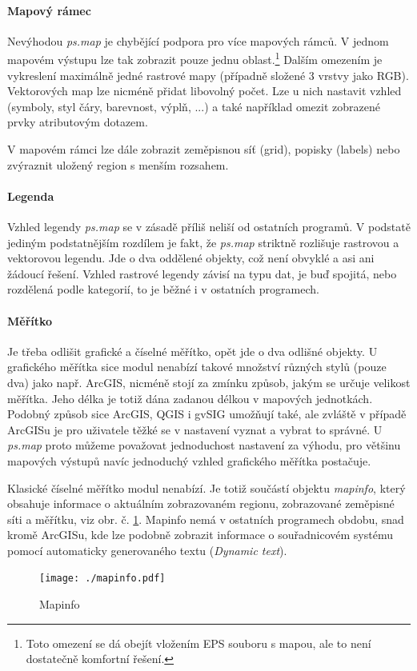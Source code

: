 \documentclass[a4paper,12pt,draft]{article}
\newcommand{\modul}[1]{\emph{#1}}
\begin{document}
\paragraph*{Mapový rámec}
Nevýhodou \modul{ps.map} je chybějící podpora pro více mapových
rámců. V jednom mapovém výstupu lze tak zobrazit pouze jednu
oblast.\footnote{Toto omezení se dá obejít vložením EPS souboru s mapou,
ale to není dostatečně komfortní řešení.} Dalším omezením je
vykreslení maximálně jedné rastrové mapy (případně složené 3 vrstvy
jako RGB). Vektorových map lze nicméně přidat libovolný počet. Lze u
nich nastavit vzhled (symboly, styl čáry, barevnost, výplň, ...) a také
například omezit zobrazené prvky atributovým dotazem.

V mapovém rámci lze dále zobrazit zeměpisnou síť (grid), popisky
(labels) nebo zvýraznit uložený region s menším rozsahem.

\paragraph*{Legenda}
Vzhled legendy \modul{ps.map} se v zásadě příliš neliší od ostatních
programů. V podstatě jediným podstatnějším rozdílem je fakt, že
\modul{ps.map} striktně rozlišuje rastrovou a vektorovou legendu. Jde o dva
oddělené objekty, což není obvyklé a asi ani žádoucí řešení. Vzhled
rastrové legendy závisí na typu dat, je buď spojitá, nebo rozdělená
podle kategorií, to je běžné i v ostatních programech.

\paragraph*{Měřítko}
Je třeba odlišit grafické a číselné měřítko, opět jde o dva
odlišné objekty.
U grafického měřítka sice modul nenabízí takové množství různých
stylů (pouze dva) jako např. ArcGIS, nicméně stojí za zmínku způsob,
jakým se určuje velikost měřítka. Jeho délka je totiž dána zadanou
délkou v mapových jednotkách. Podobný způsob sice ArcGIS, QGIS i gvSIG
umožňují také, ale zvláště v případě ArcGISu je pro uživatele
těžké se v nastavení vyznat a vybrat to správné. U \modul{ps.map} proto
můžeme považovat jednoduchost nastavení za výhodu, pro většinu mapových
výstupů navíc jednoduchý vzhled grafického měřítka postačuje.

Klasické číselné měřítko modul nenabízí. Je totiž součástí
objektu \emph{mapinfo}, který obsahuje informace o aktuálním
zobrazovaném regionu, zobrazované zeměpisné síti a měřítku, viz
obr. č. \ref{fig:mapinfo}. Mapinfo nemá v ostatních programech obdobu,
snad kromě ArcGISu, kde lze podobně zobrazit informace o souřadnicovém
systému pomocí automaticky generovaného textu (\emph{Dynamic text}).
\begin{figure}[h!]
    \centering
    \texttt{[image: ./mapinfo.pdf]}
    \caption{Mapinfo}
    \label{fig:mapinfo}
\end{figure}
\end{document}
